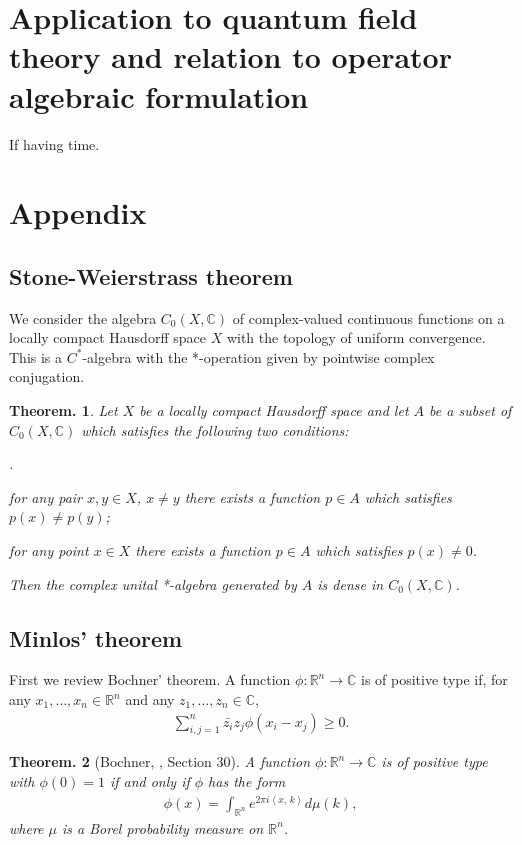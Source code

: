 \documentclass[openany, a4paper, oneside]{jsbook}
\newcounter{enum2}
\renewenvironment{enumerate}{%
\begin{list}%
{%
\arabic{enum2}.\ \,%
}%
{%
\usecounter{enum2}
\setlength{\itemindent}{0pt}%
\setlength{\leftmargin}{15pt}%
\setlength{\rightmargin}{0pt}%
\setlength{\labelsep}{0pt}%
\setlength{\labelwidth}{6pt}%
\setlength{\itemsep}{0pt}%
\setlength{\parsep}{0pt}%
\setlength{\listparindent}{0pt}%
}
}{%
\end{list}%
}
\theoremstyle{break}
\theoremstyle{breakdefn}
\newtheorem{thm}{Theorem.}[section]
\newcommand{\bkt}[2]{\left\langle#1,\,#2\right\rangle}
\newcommand{\bbC}{\mathbb{C}}
\newcommand{\bbRn}{\mathbb{R}^n}
\begin{document}
\section{Application to quantum field theory and relation to operator algebraic formulation}


If having time.
\section{Appendix}

\subsection{Stone-Weierstrass theorem}


We consider the algebra $C_0 (X, \bbC)$ of complex-valued continuous functions on
a locally compact Hausdorff space $X$ with the topology of uniform convergence.
This is a $C^*$-algebra with the *-operation given by pointwise complex conjugation.
\begin{thm}
 Let $X$ be a locally compact Hausdorff space and let $A$ be a subset of $C_0 (X, \bbC)$ which satisfies the following two conditions:
\begin{enumerate}
\item for any pair $x, y \in X$, $x \neq y$ there exists a function $p \in A$ which satisfies $p (x) \neq p (y)$;
\item for any point $x \in X$ there exists a function $p \in A$ which satisfies $p (x) \neq 0$.
\end{enumerate}
 Then the complex unital *-algebra generated by $A$ is dense in $C_0 (X, \bbC)$.
\end{thm}
\subsection{Minlos' theorem}


First we review Bochner' theorem.
A function $\phi \colon \bbRn \to \bbC$ is of positive type if, for any $x_1, \dots, x_n \in \bbRn$ and any $z_1, \dots, z_n \in \bbC$,
\begin{align}
 \sum_{i,j=1}^n \bar{z_i} z_j \phi (x_i - x_j) \geq 0.
\end{align}
\begin{thm}[Bochner, \cite{SeizoIto1}, Section 30]
 A function $\phi \colon \bbRn \to \bbC$ is of positive type with $\phi (0) = 1$ if and only if $\phi$ has the form
 \begin{align}
  \phi (x)
  =
  \int_{\bbRn} e^{2 \pi i \bkt{x}{k}} d \mu (k),
 \end{align}
 where $\mu$ is a Borel probability measure on $\bbRn$.
\end{thm}
\end{document}
